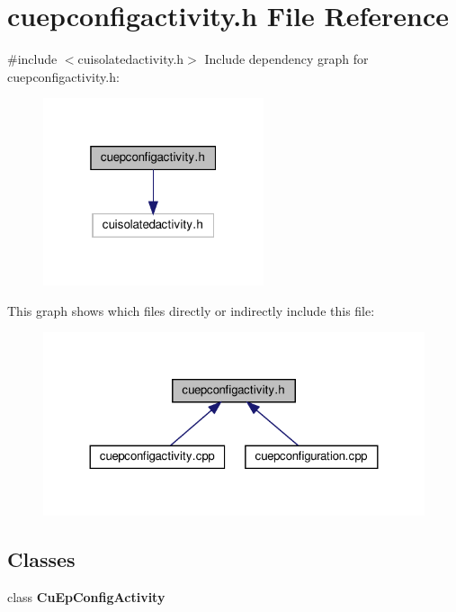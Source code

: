 \section{cuepconfigactivity.\+h File Reference}
\label{cuepconfigactivity_8h}
{\ttfamily \#include $<$cuisolatedactivity.\+h$>$}\newline
Include dependency graph for cuepconfigactivity.\+h\+:\nopagebreak
\begin{figure}[H]
\begin{center}
\leavevmode
\includegraphics[width=184pt]{cuepconfigactivity_8h__incl}
\end{center}
\end{figure}
This graph shows which files directly or indirectly include this file\+:\nopagebreak
\begin{figure}[H]
\begin{center}
\leavevmode
\includegraphics[width=324pt]{cuepconfigactivity_8h__dep__incl}
\end{center}
\end{figure}
\subsection*{Classes}
\begin{DoxyCompactItemize}
\item 
class \textbf{ Cu\+Ep\+Config\+Activity}
\end{DoxyCompactItemize}
